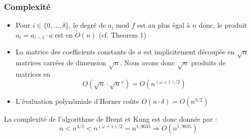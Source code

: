 \documentclass[a4paper]{article}
\begin{document}
\newpage
\subsubsection*{Complexité}
\begin{itemize}
    \item Pour $i \in \{0,...,\delta\}$, le degré de $a_i$ mod $f$ est au plus égal à $n$ donc, le produit $a_i=a_{i-1}\cdot a$ est en $\tilde{O}(n)$ (cf. Theorem 1)
    \item La matrice des coefficients constants de $a$ est implicitement découpée en $\sqrt{n}$ matrices carrées de dimension $\sqrt{n}$.
    Nous avons donc $\sqrt{n}$ produits de matrices en $$O(\sqrt{n}\cdot \sqrt{n}^{\omega})=O(n^{(\omega+1)/2})$$ 
    \item L'évaluation polynômiale d'Horner coûte $O(n\cdot \delta)=O(n^{3/2})$
\end{itemize}
La complexité de l'algorithme de Brent et Kung est donc donnée par :
\[
n < n^{3/2} < n^{(\omega+1)/2}= n^{1,9035} \Longrightarrow O(n^{1,9035})
\]
\end{document}
